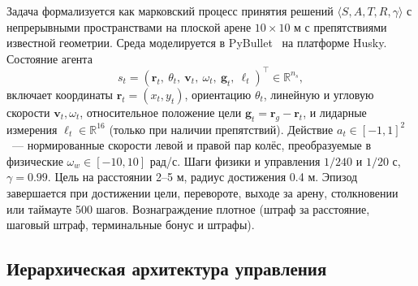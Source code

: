 \documentclass[11pt]{article}
\begin{document}
Задача формализуется как марковский процесс принятия решений $\langle S, A, T, R, \gamma \rangle$ с непрерывными пространствами на плоской арене $10 \times 10$ м с препятствиями известной геометрии. Среда моделируется в PyBullet~\cite{coumans2021pybullet} на платформе Husky. Состояние агента
\begin{equation}
s_t = (\mathbf{r}_t,\ \theta_t,\ \mathbf{v}_t,\ \omega_t,\ \mathbf{g}_t,\ \ell_t)^\top \in \mathbb{R}^{n_s},
\end{equation}
включает координаты $\mathbf{r}_t = (x_t, y_t)$, ориентацию $\theta_t$, линейную и угловую скорости $\mathbf{v}_t, \omega_t$, относительное положение цели $\mathbf{g}_t = \mathbf{r}_g - \mathbf{r}_t$, и лидарные измерения $\ell_t \in \mathbb{R}^{16}$ (только при наличии препятствий). Действие $a_t \in [-1, 1]^2$~--- нормированные скорости левой и правой пар колёс, преобразуемые в физические $\omega_w \in [-10, 10]$ рад/с. Шаги физики и управления $1/240$ и $1/20$ с, $\gamma = 0.99$. Цель на расстоянии 2--5 м, радиус достижения 0.4 м. Эпизод завершается при достижении цели, перевороте, выходе за арену, столкновении или таймауте 500 шагов. Вознаграждение плотное (штраф за расстояние, шаговый штраф, терминальные бонус и штрафы).


\subsection{Иерархическая архитектура управления}
\label{sec:architecture}
\end{document}
